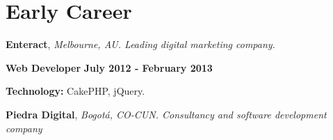 

\section{Early Career}
%
\textbf{Enteract},
\textit{Melbourne, AU. Leading digital marketing company.}

\begin{outerlist}
\item[\FA \faAngleDoubleRight] \textbf{Web Developer} \hfill
\textbf{July 2012 - February 2013}
\end{outerlist}
% 
    \begin{innerlist}
\item \textbf{Technology:} CakePHP, jQuery.
    \end{innerlist}

\quarterblankline

\textbf{Piedra Digital},
\textit{Bogot\'a, CO-CUN. Consultancy and software development
company}

